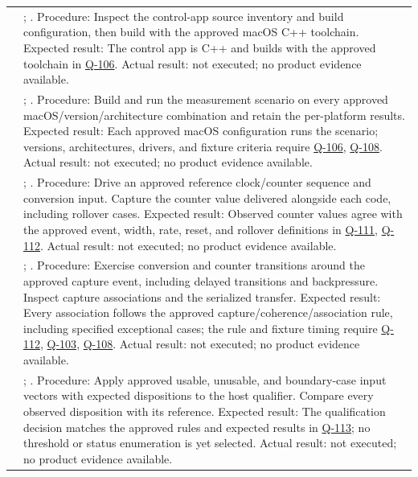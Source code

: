 \begin{tabularx}{\linewidth}{L{2cm}Y}
 & ; . Procedure: Inspect the control-app source inventory and build configuration, then build with the approved macOS C++ toolchain. Expected result: The control app is C++ and builds with the approved toolchain in \hyperref[Question:Q-106]{Q-106}. Actual result: not executed; no product evidence available.\\
 & ; . Procedure: Build and run the measurement scenario on every approved macOS/version/architecture combination and retain the per-platform results. Expected result: Each approved macOS configuration runs the scenario; versions, architectures, drivers, and fixture criteria require \hyperref[Question:Q-106]{Q-106}, \hyperref[Question:Q-108]{Q-108}. Actual result: not executed; no product evidence available.\\
 & ; . Procedure: Drive an approved reference clock/counter sequence and conversion input. Capture the counter value delivered alongside each code, including rollover cases. Expected result: Observed counter values agree with the approved event, width, rate, reset, and rollover definitions in \hyperref[Question:Q-111]{Q-111}, \hyperref[Question:Q-112]{Q-112}. Actual result: not executed; no product evidence available.\\
 & ; . Procedure: Exercise conversion and counter transitions around the approved capture event, including delayed transitions and backpressure. Inspect capture associations and the serialized transfer. Expected result: Every association follows the approved capture/coherence/association rule, including specified exceptional cases; the rule and fixture timing require \hyperref[Question:Q-112]{Q-112}, \hyperref[Question:Q-103]{Q-103}, \hyperref[Question:Q-108]{Q-108}. Actual result: not executed; no product evidence available.\\
 & ; . Procedure: Apply approved usable, unusable, and boundary-case input vectors with expected dispositions to the host qualifier. Compare every observed disposition with its reference. Expected result: The qualification decision matches the approved rules and expected results in \hyperref[Question:Q-113]{Q-113}; no threshold or status enumeration is yet selected. Actual result: not executed; no product evidence available.\\

\end{tabularx}
